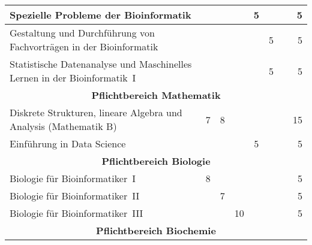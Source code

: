 \begin{table}[tbp]
\begin{small}
\begin{tabularx}{\textwidth}{|X||c|c|c|c|c|c||r|}
			Spezielle Probleme der Bioinformatik                                     &    &    &    & 5  &    &                               &           5 \\ \hline
			Gestaltung und Durchführung von Fachvorträgen in der Bioinformatik       &    &    &    &    & 5  &                               &           5 \\ \hline
			Statistische Datenanalyse und Maschinelles Lernen in der Bioinformatik~I &    &    &    &    & 5  &                               &           5 \\ \hline\hline
			\multicolumn{8}{|c|}{\textbf{Pflichtbereich Mathematik}}                                                                                        \\ \hline
			Diskrete Strukturen, lineare Algebra und Analysis (Mathematik B)         & 7  & 8  &    &    &    &                               &          15 \\ \hline
			Einführung in Data Science                                               &    &    &    & 5  &    &                               &           5 \\ \hline\hline
			\multicolumn{8}{|c|}{\textbf{Pflichtbereich Biologie}}                                                                                          \\ \hline
			Biologie für Bioinformatiker~I                                           & 8  &    &    &    &    &                               &           5 \\ \hline
			Biologie für Bioinformatiker~II                                          &    & 7  &    &    &    &                               &           5 \\ \hline
			Biologie für Bioinformatiker~III                                         &    &    & 10 &    &    &                               &           5 \\ \hline\hline
			\multicolumn{8}{|c|}{\textbf{Pflichtbereich Biochemie}}                                                                                         \\ \hline

\end{tabularx}
\end{small}
\end{table}
